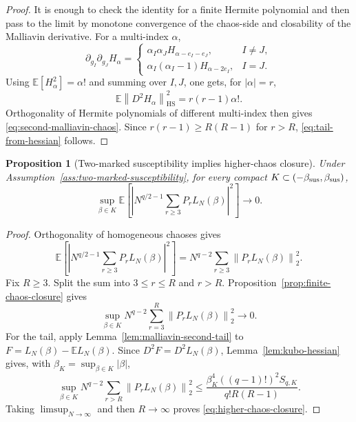 \documentclass[11pt]{article}
\newtheorem{proposition}[theorem]{Proposition}
\newcommand{\E}{\mathbb{E}}
\newcommand{\norm}[1]{\left\lVert #1\right\rVert}
\newcommand{\HS}{\mathrm{HS}}
\begin{document}
\begin{proof}
  It is enough to check the identity for a finite Hermite polynomial and then
  pass to the limit by monotone convergence of the chaos-side and closability of
  the Malliavin derivative.  For a multi-index $\alpha$,
  \begin{equation}\label{eq:second-derivative-Hermite}
    \partial_{g_I}\partial_{g_J}H_\alpha
    =
    \begin{cases}
      \alpha_I\alpha_J
      H_{\alpha-e_I-e_J}, & I\neq J, \\
      \alpha_I(\alpha_I-1)H_{\alpha-2e_I}, & I=J.
    \end{cases}
  \end{equation}
  Using $\E[H_\alpha^2]=\alpha!$ and summing over $I,J$, one gets, for
  $|\alpha|=r$,
  \begin{equation}\label{eq:Hessian-Halpha}
    \E\norm{D^2H_\alpha}_{\HS}^2
    =
    r(r-1)\alpha!.
  \end{equation}
  Orthogonality of Hermite polynomials of different multi-index then gives
  \eqref{eq:second-malliavin-chaos}.  Since $r(r-1)\geq R(R-1)$ for
  $r>R$, \eqref{eq:tail-from-hessian} follows.
\end{proof}

\begin{proposition}[Two-marked susceptibility implies higher-chaos closure]
  \label{prop:higher-from-two-marked}
  Under Assumption~\ref{ass:two-marked-susceptibility}, for every compact
  $K\subset(-\beta_{\rm sus},\beta_{\rm sus})$,
  \begin{equation}\label{eq:higher-chaos-closure}
    \sup_{\beta\in K}
    \E\left[
      \left|
        N^{q/2-1}\sum_{r\geq3}P_rL_N(\beta)
      \right|^2
    \right]
    \to0.
  \end{equation}
\end{proposition}

\begin{proof}
  Orthogonality of homogeneous chaoses gives
  \begin{equation}\label{eq:higher-orthogonal-sum}
    \E\left[
      \left|
        N^{q/2-1}\sum_{r\geq3}P_rL_N(\beta)
      \right|^2
    \right]
    =
    N^{q-2}\sum_{r\geq3}\norm{P_rL_N(\beta)}_2^2.
  \end{equation}
  Fix $R\geq3$.  Split the sum into $3\leq r\leq R$ and $r>R$.
  Proposition~\ref{prop:finite-chaos-closure} gives
  \begin{equation}\label{eq:finite-part-vanishes}
    \sup_{\beta\in K}
    N^{q-2}
    \sum_{r=3}^R\norm{P_rL_N(\beta)}_2^2
    \to0.
  \end{equation}
  For the tail, apply Lemma~\ref{lem:malliavin-second-tail} to
  $F=L_N(\beta)-\E L_N(\beta)$.  Since $D^2F=D^2L_N(\beta)$,
  Lemma~\ref{lem:kubo-hessian} gives, with
  $\beta_K=\sup_{\beta\in K}|\beta|$,
  \begin{equation}\label{eq:tail-hessian-bound}
    \sup_{\beta\in K}
    N^{q-2}
    \sum_{r>R}\norm{P_rL_N(\beta)}_2^2
    \leq
    \frac{\beta_K^4((q-1)!)^2S_{q,K}}{q!R(R-1)}.
  \end{equation}
  Taking $\limsup_{N\to\infty}$ and then $R\to\infty$ proves
  \eqref{eq:higher-chaos-closure}.
\end{proof}
\end{document}
